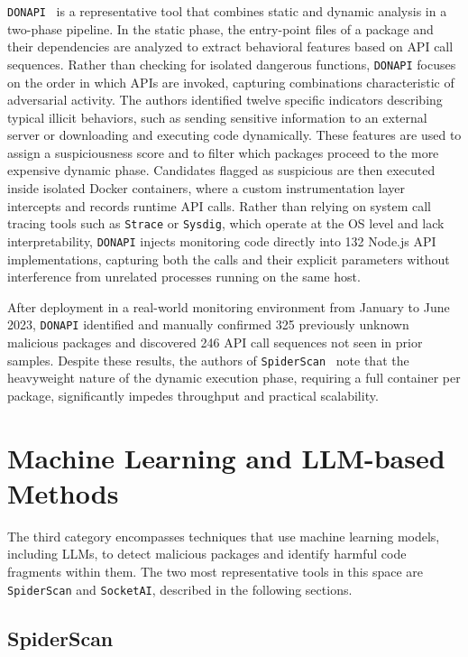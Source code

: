 \texttt{DONAPI}~\cite{huang2024donapimaliciousnpmpackages} is a representative tool 
that combines static and dynamic analysis in a two-phase pipeline.
In the static phase, the entry-point files of a package and their dependencies are analyzed 
to extract behavioral features based on \ac{API} call sequences.
Rather than checking for isolated dangerous functions, \texttt{DONAPI} focuses on the order in which \acp{API} are invoked, 
capturing combinations characteristic of adversarial activity.
The authors identified twelve specific indicators describing typical illicit behaviors, 
such as sending sensitive information to an external server or downloading and executing code dynamically.
These features are used to assign a suspiciousness score and to filter which packages proceed to the more expensive dynamic phase.
Candidates flagged as suspicious are then executed inside isolated Docker containers, 
where a custom instrumentation layer intercepts and records runtime \ac{API} calls. 
Rather than relying on system call tracing tools such as \texttt{Strace} or \texttt{Sysdig}, 
which operate at the OS level and lack interpretability, 
\texttt{DONAPI} injects monitoring code directly into 132 Node.js \ac{API} implementations,
capturing both the calls and their explicit parameters without interference from unrelated processes running on the same host.

After deployment in a real-world monitoring environment from January to June 2023, 
\texttt{DONAPI} identified and manually confirmed 325 previously unknown malicious packages 
and discovered 246 \ac{API} call sequences not seen in prior samples. 
Despite these results, the authors of \texttt{SpiderScan}~\cite{10.1145/3691620.3695492} 
note that the heavyweight nature of the dynamic execution phase, 
requiring a full container per package, significantly impedes throughput and practical scalability.

\section{Machine Learning and LLM-based Methods}
\label{sec:MLAndLLM}

The third category encompasses techniques that use machine learning models, including \acp{LLM}, 
to detect malicious packages and identify harmful code fragments within them.
The two most representative tools in this space are \texttt{SpiderScan} and \texttt{SocketAI}, 
described in the following sections.

\subsection{SpiderScan}
\label{subsec:SpiderScan}

